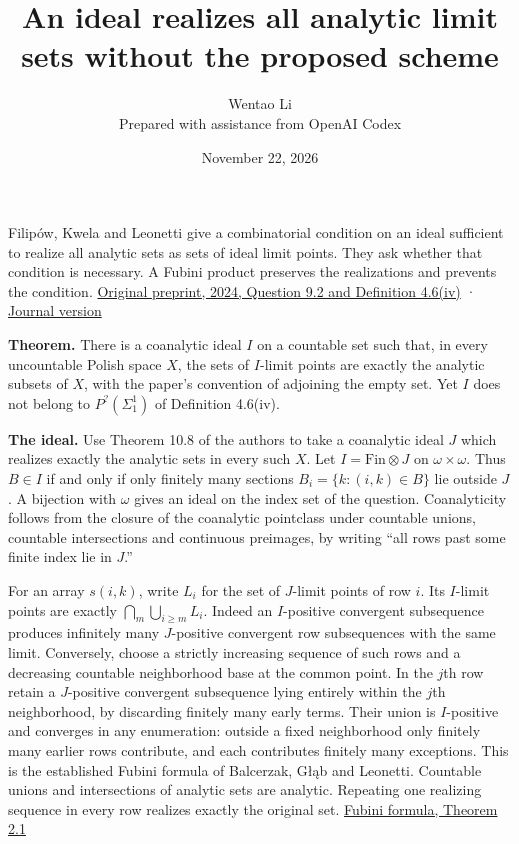 \documentclass[11pt]{article}
\author{Wentao Li\\\small Prepared with assistance from OpenAI Codex}
\date{November 22, 2026}
\title{An ideal realizes all analytic limit sets without the proposed scheme}
\begin{document}
\maketitle
Filipów, Kwela and Leonetti give a combinatorial condition on an ideal sufficient to realize all analytic sets as sets of ideal limit points. They ask whether that condition is necessary. A Fubini product preserves the realizations and prevents the condition. \href{https://arxiv.org/abs/2411.10866}{Original preprint, 2024, Question 9.2 and Definition 4.6(iv)} · \href{https://doi.org/10.1017/jsl.2026.10181}{Journal version}

\textbf{Theorem.} There is a coanalytic ideal \(I\) on a countable set such that, in every uncountable Polish space \(X\), the sets of \(I\)-limit points are exactly the analytic subsets of \(X\), with the paper's convention of adjoining the empty set. Yet \(I\) does not belong to \(P^{?}(\Sigma^1_1)\) of Definition 4.6(iv).

\textbf{The ideal.} Use Theorem 10.8 of the authors to take a coanalytic ideal \(J\) which realizes exactly the analytic sets in every such \(X\). Let \(I=\mathrm{Fin}\otimes J\) on \(\omega\times\omega\). Thus \(B\in I\) if and only if only finitely many sections \(B_i=\{k:(i,k)\in B\}\) lie outside \(J\). A bijection with \(\omega\) gives an ideal on the index set of the question. Coanalyticity follows from the closure of the coanalytic pointclass under countable unions, countable intersections and continuous preimages, by writing ``all rows past some finite index lie in \(J\).''

For an array \(s(i,k)\), write \(L_i\) for the set of \(J\)-limit points of row \(i\). Its \(I\)-limit points are exactly \(\bigcap_m\bigcup_{i\ge m}L_i\). Indeed an \(I\)-positive convergent subsequence produces infinitely many \(J\)-positive convergent row subsequences with the same limit. Conversely, choose a strictly increasing sequence of such rows and a decreasing countable neighborhood base at the common point. In the \(j\)th row retain a \(J\)-positive convergent subsequence lying entirely within the \(j\)th neighborhood, by discarding finitely many early terms. Their union is \(I\)-positive and converges in any enumeration: outside a fixed neighborhood only finitely many earlier rows contribute, and each contributes finitely many exceptions. This is the established Fubini formula of Balcerzak, Głąb and Leonetti. Countable unions and intersections of analytic sets are analytic. Repeating one realizing sequence in every row realizes exactly the original set. \href{https://arxiv.org/abs/2407.12160}{Fubini formula, Theorem 2.1}
\end{document}
